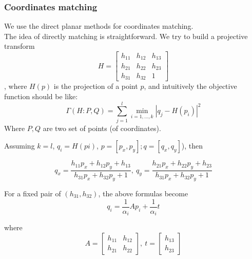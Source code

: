 \documentclass{beamer}
\begin{document}
\begin{frame}
\frametitle{Coordinates matching}
We use the direct planar methods for coordinates matching.\\

The idea of directly matching is straightforward. We try to build a projective transform 
\begin{equation}
H =
\begin{bmatrix}
h_{11} & h_{12} & h_{13}\\
h_{21} & h_{22} & h_{23}\\
h_{31} & h_{32} & 1
\end{bmatrix}
\end{equation},
where $H(p)$ is the projection of a point $p$, and intuitively the objective function should be like:
\begin{equation}
\Gamma(H:P,Q) = \sum_{j=1}^{l} \min_{i=1,...,k} |q_j - H(p_i)|^2
\end{equation}
Where $P,Q$ are two set of points (of coordinates).

\end{frame}

\begin{frame}
Assuming $k = l$, $q_i = H(pi)$, $p = [p_x, p_y]; q = [q_x, q_y]$), then

\begin{equation}
q_x =
\frac{h_{11}p_x + h_{12}p_y + h_{13}}{h_{31}p_x + h_{32}p_y + 1}, ~
q_y =
\frac{h_{21}p_x + h_{22}p_y + h_{23}}
{h_{31}p_x + h_{32}p_y + 1}
\end{equation}

For a fixed pair of $(h_{31}, h_{32})$, the above formulas become
\begin{equation}
q_i = \frac{1}{\alpha_i}A p_i + \frac{1}{\alpha_i}t
\end{equation}

where 
\begin{equation}
A =
\begin{bmatrix}
h_{11} & h_{12}\\
h_{21} & h_{22} 
\end{bmatrix},~
t =
\begin{bmatrix}
h_{13}\\
h_{23}
\end{bmatrix}
\end{equation}
\end{frame}
\end{document}
